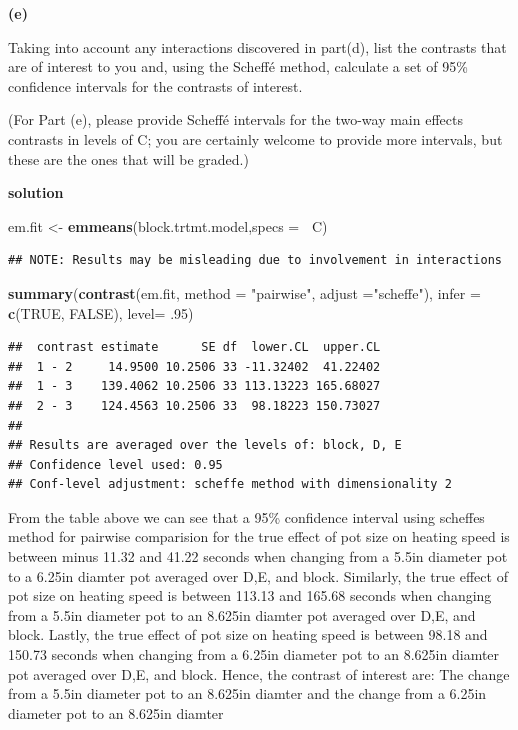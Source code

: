 \documentclass[12pt,]{article}
\newenvironment{Shaded}{\begin{snugshade}}{\end{snugshade}}
\newcommand{\KeywordTok}[1]{\textcolor[rgb]{0.13,0.29,0.53}{\textbf{#1}}}
\newcommand{\DataTypeTok}[1]{\textcolor[rgb]{0.13,0.29,0.53}{#1}}
\newcommand{\DecValTok}[1]{\textcolor[rgb]{0.00,0.00,0.81}{#1}}
\newcommand{\StringTok}[1]{\textcolor[rgb]{0.31,0.60,0.02}{#1}}
\newcommand{\OtherTok}[1]{\textcolor[rgb]{0.56,0.35,0.01}{#1}}
\newcommand{\OperatorTok}[1]{\textcolor[rgb]{0.81,0.36,0.00}{\textbf{#1}}}
\newcommand{\NormalTok}[1]{#1}
\begin{document}
\textbf{(e)}

Taking into account any interactions discovered in part(d), list the
contrasts that are of interest to you and, using the Scheffé method,
calculate a set of 95\% confidence intervals for the contrasts of
interest.

(For Part (e), please provide Scheffé intervals for the two-way main
effects contrasts in levels of C; you are certainly welcome to provide
more intervals, but these are the ones that will be graded.)

\textbf{solution}

\begin{Shaded}
\begin{Highlighting}[]
\NormalTok{em.fit <-}\StringTok{ }\KeywordTok{emmeans}\NormalTok{(block.trtmt.model,}\DataTypeTok{specs =}\OperatorTok{~}\StringTok{ }\NormalTok{C)}
\end{Highlighting}
\end{Shaded}

\begin{verbatim}
## NOTE: Results may be misleading due to involvement in interactions
\end{verbatim}

\begin{Shaded}
\begin{Highlighting}[]
\KeywordTok{summary}\NormalTok{(}\KeywordTok{contrast}\NormalTok{(em.fit, }\DataTypeTok{method =} \StringTok{"pairwise"}\NormalTok{, }\DataTypeTok{adjust =}\StringTok{"scheffe"}\NormalTok{), }\DataTypeTok{infer =} \KeywordTok{c}\NormalTok{(}\OtherTok{TRUE}\NormalTok{, }\OtherTok{FALSE}\NormalTok{), }\DataTypeTok{level=}\NormalTok{ .}\DecValTok{95}\NormalTok{)}
\end{Highlighting}
\end{Shaded}

\begin{verbatim}
##  contrast estimate      SE df  lower.CL  upper.CL
##  1 - 2     14.9500 10.2506 33 -11.32402  41.22402
##  1 - 3    139.4062 10.2506 33 113.13223 165.68027
##  2 - 3    124.4563 10.2506 33  98.18223 150.73027
## 
## Results are averaged over the levels of: block, D, E 
## Confidence level used: 0.95 
## Conf-level adjustment: scheffe method with dimensionality 2
\end{verbatim}

From the table above we can see that a 95\% confidence interval using
scheffes method for pairwise comparision for the true effect of pot size
on heating speed is between minus 11.32 and 41.22 seconds when changing
from a 5.5in diameter pot to a 6.25in diamter pot averaged over D,E, and
block. Similarly, the true effect of pot size on heating speed is
between 113.13 and 165.68 seconds when changing from a 5.5in diameter
pot to an 8.625in diamter pot averaged over D,E, and block. Lastly, the
true effect of pot size on heating speed is between 98.18 and 150.73
seconds when changing from a 6.25in diameter pot to an 8.625in diamter
pot averaged over D,E, and block. Hence, the contrast of interest are:
The change from a 5.5in diameter pot to an 8.625in diamter and the
change from a 6.25in diameter pot to an 8.625in diamter
\end{document}
